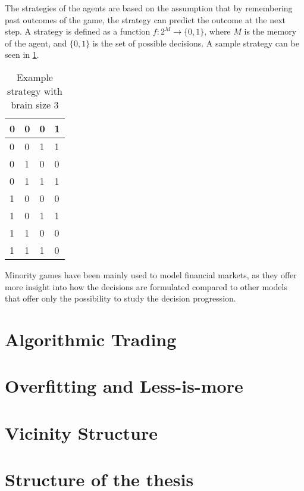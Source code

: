 The strategies of the agents are based on the assumption that by remembering past outcomes of the game, the strategy can predict the outcome at the next step.
A strategy is defined as a function $f:2^M\to\{0,1\}$, where $M$ is the memory of the agent, and $\{0,1\}$ is the set of possible decisions.
A sample strategy can be seen in \ref{table:minorityStrategy}.

\begin{table}
\centering
\begin{tabular}{|l|l|l||l|}
\hline
0 & 0 & 0 & 1   \\ \hline
0 & 0 & 1 & 1   \\ \hline
0 & 1 & 0 & 0   \\ \hline
0 & 1 & 1 & 1   \\ \hline
1 & 0 & 0 & 0   \\ \hline
1 & 0 & 1 & 1   \\ \hline
1 & 1 & 0 & 0   \\ \hline
1 & 1 & 1 & 0   \\ \hline
\end{tabular}
\caption{Example strategy with brain size 3}
\label{table:minorityStrategy}
\end{table}

Minority games have been mainly used to model financial markets, as they offer more insight into how the decisions are formulated compared to other models that offer only the possibility to study the decision progression.


\section{Algorithmic Trading}
\label{1:finance}

\section{Overfitting and Less-is-more}
\label{1:overfitting}

\section{Vicinity Structure}
\label{1:vicinity}

\section{Structure of the thesis}